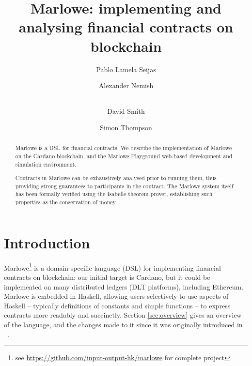 \documentclass[runningheads]{llncs}
\begin{document}
%
\title{Marlowe: implementing and analysing financial contracts on blockchain}%
%
%
\author{
Pablo {Lamela Seijas} \and
Alexander Nemish \and \\
David Smith \and
Simon Thompson}%
%

%
%
\maketitle              %

\vspace{-4mm}
\begin{abstract}
Marlowe is a DSL for financial contracts. We describe the implementation of Marlowe on the Cardano blockchain, and the Marlowe Playground web-based development and simulation environment.

Contracts in Marlowe can be exhaustively analysed prior to running them, thus providing strong guarantees to participants in the contract. The Marlowe system itself has been formally verified using the Isabelle theorem prover, establishing such properties as the conservation of money.

\end{abstract}


\section{Introduction}

Marlowe\footnote{see \url{https://github.com/input-output-hk/marlowe} for complete project} is a domain-specific language (DSL) for implementing financial contracts on blockchain: our initial target is Cardano, but it could be implemented on many distributed ledgers (DLT platforms), including Ethereum. Marlowe is embedded in Haskell, allowing users selectively to use aspects of Haskell -- typically definitions of constants and simple functions -- to express contracts more readably and succinctly. Section \ref{sec:overview} gives an overview of the language, and the changes made to it since it was originally introduced in ~\cite{isola-marlowe}.
\end{document}
